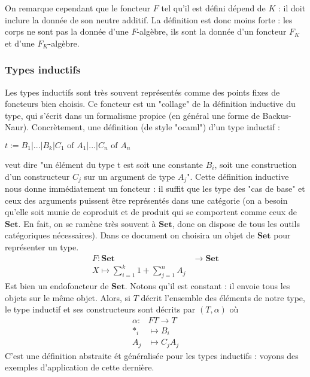\documentclass{article}
\begin{document}
On remarque cependant que le foncteur $F$ tel qu'il est défini dépend de $K$ : il doit inclure la donnée de son neutre additif. La définition est donc moins forte : les corps ne sont pas la donnée d'une $F$-algèbre, ils sont la donnée d'un foncteur $F_K$ et d'une $F_K$-algèbre.

\subsubsection{Types inductifs}

Les types inductifs sont très souvent représentés comme des points fixes de foncteurs bien choisis. Ce foncteur est un "collage" de la définition inductive du type, qui s'écrit dans un formalisme propice (en général une forme de Backus-Naur). Concrètement,  une définition (de style "ocaml") d'un type inductif : 
\begin{center}
    $  t := B_1 | ... | B_k | C_1 \text{ of } A_1 | ... | C_n \text{ of } A_n $
\end{center}
veut dire "un élément du type t est soit une constante $B_i$, soit une construction d'un constructeur $C_j$ sur un argument de type $A_j$". Cette définition inductive nous donne immédiatement un foncteur : il suffit que les type des "cas de base" et ceux des arguments puissent être représentés dans une catégorie (on a besoin qu'elle soit munie de coproduit et de produit qui se comportent comme ceux de $\mathbf{Set}$. En fait, on se ramène très souvent à $\mathbf{Set}$, donc on dispose de tous les outils catégoriques nécessaires). Dans ce document on choisira un objet de $\mathbf{Set}$ pour représenter un type.  
\begin{align*}
    F : \mathbf{Set} & \rightarrow \mathbf{Set} \\ 
    X \mapsto \sum_{i=1}^k 1 + \sum_{j=1}^n A_j
\end{align*}
Est bien un endofoncteur de $\mathbf{Set}$. Notons qu'il est constant : il envoie tous les objets sur le même objet. Alors, si $T$ décrit l'ensemble des éléments de notre type, le type inductif et ses constructeurs sont décrits par $(T,\alpha)$ où
\begin{align*}
    \alpha : & F T \rightarrow T  \\ 
    *_i & \mapsto B_i \\ 
    A_j & \mapsto C_j A_j
\end{align*}
C'est une définition abstraite ét généralisée pour les types inductifs : voyons des exemples d'application de cette dernière.  \\ 
\end{document}
